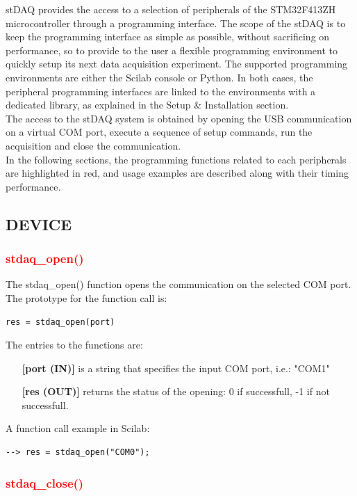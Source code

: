 \documentclass[letterpaper,10pt,english]{hitec}
\begin{document}
stDAQ provides the access to a selection of peripherals of the STM32F413ZH microcontroller through a programming interface. The scope of the stDAQ is to keep the programming interface as simple as possible, without sacrificing on performance, so to provide to the user a flexible programming environment to quickly setup its next data acquisition experiment. The supported programming environments are either the Scilab console or Python. In both cases, the peripheral programming interfaces are linked to the environments with a dedicated library, as explained in the Setup \& Installation section. \\
The access to the stDAQ system is obtained by opening the USB communication on a virtual COM port, execute a sequence of setup commands, run the acquisition and close the communication. \\
In the following sections, the programming functions related to each peripherals are highlighted in red, and usage examples are described along with their timing performance.

\subsection{DEVICE}

\subsubsection{\textcolor{red}{stdaq\_open()}}

The stdaq\_open() function opens the communication on the selected COM port. \\
The prototype for the function call is:
\begin{verbatim}
res = stdaq_open(port)
\end{verbatim}
The entries to the functions are:
\begin{itemize}
\item [\textbf{[port (IN)]}] is a string that specifies the input COM port, i.e.: "COM1"
\item [\textbf{[res (OUT)]}] returns the status of the opening: 0 if successfull, -1 if not successfull.
\end{itemize}
A function call example in Scilab:
\begin{verbatim}
--> res = stdaq_open("COM0");
\end{verbatim}

\subsubsection{\textcolor{red}{stdaq\_close()}}
\end{document}
